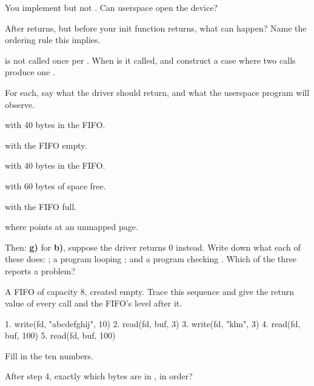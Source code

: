  You implement  but not . Can userspace open the device?

 After  returns, but before your init function returns, what can happen?
Name the ordering rule this implies.

  is not called once per . When is it called, and construct a
case where two  calls produce one .

\label{c5:ex:3}

For each, say what the driver should return, and what the userspace program will observe.

  with 40 bytes in the FIFO.

  with the FIFO empty.

  with 40 bytes in the FIFO.

  with 60 bytes of space free.

  with the FIFO full.

  where  points at an unmapped page.

Then: \textbf{g)} for \textbf{b)}, suppose the driver returns 0 instead. Write down what each of
these does: ; a program looping ; and
a program checking . Which of the three reports a problem?

\label{c5:ex:4}

A FIFO of capacity 8, created empty. Trace this sequence and give the return value of every call and
the FIFO's level after it.

\begin{console}
1.  write(fd, "abcdefghij", 10)
2.  read(fd, buf, 3)
3.  write(fd, "klm", 3)
4.  read(fd, buf, 100)
5.  read(fd, buf, 100)
\end{console}

 Fill in the ten numbers.

 After step 4, exactly which bytes are in , in order?


